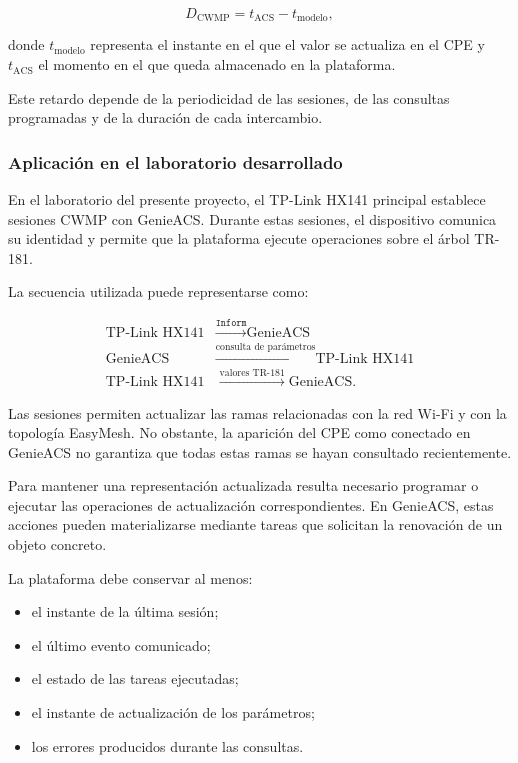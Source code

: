 \[
    D_{\mathrm{CWMP}}
    =
    t_{\mathrm{ACS}}
    -
    t_{\mathrm{modelo}},
\]

donde \(t_{\mathrm{modelo}}\) representa el instante en el que el valor se
actualiza en el CPE y \(t_{\mathrm{ACS}}\) el momento en el que queda
almacenado en la plataforma.

Este retardo depende de la periodicidad de las sesiones, de las consultas
programadas y de la duración de cada intercambio.


\subsubsection*{Aplicación en el laboratorio desarrollado}

En el laboratorio del presente proyecto, el TP-Link HX141 principal
establece sesiones CWMP con GenieACS. Durante estas sesiones, el
dispositivo comunica su identidad y permite que la plataforma ejecute
operaciones sobre el árbol TR-181.

La secuencia utilizada puede representarse como:

\[
\begin{aligned}
    \text{TP-Link HX141}
    &\xrightarrow{\texttt{Inform}}
    \text{GenieACS}\\
    \text{GenieACS}
    &\xrightarrow{\text{consulta de parámetros}}
    \text{TP-Link HX141}\\
    \text{TP-Link HX141}
    &\xrightarrow{\text{valores TR-181}}
    \text{GenieACS}.
\end{aligned}
\]

Las sesiones permiten actualizar las ramas relacionadas con la red
Wi-Fi y con la topología EasyMesh. No obstante, la aparición del CPE como
conectado en GenieACS no garantiza que todas estas ramas se hayan
consultado recientemente.

Para mantener una representación actualizada resulta necesario programar
o ejecutar las operaciones de actualización correspondientes. En
GenieACS, estas acciones pueden materializarse mediante tareas que
solicitan la renovación de un objeto concreto.

La plataforma debe conservar al menos:

\begin{itemize}
    \item el instante de la última sesión;
    \item el último evento comunicado;
    \item el estado de las tareas ejecutadas;
    \item el instante de actualización de los parámetros;
    \item los errores producidos durante las consultas.
\end{itemize}

